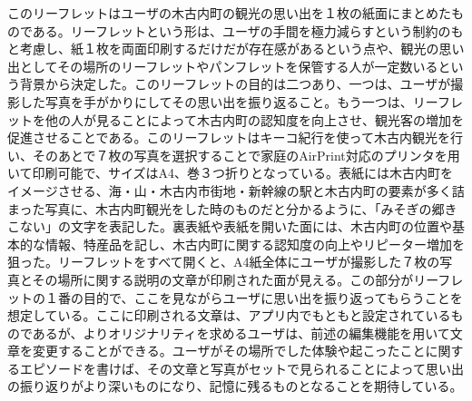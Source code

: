 このリーフレットはユーザの木古内町の観光の思い出を１枚の紙面にまとめたものである。リーフレットという形は、ユーザの手間を極力減らすという制約のもと考慮し、紙１枚を両面印刷するだけだが存在感があるという点や、観光の思い出としてその場所のリーフレットやパンフレットを保管する人が一定数いるという背景から決定した。このリーフレットの目的は二つあり、一つは、ユーザが撮影した写真を手がかりにしてその思い出を振り返ること。もう一つは、リーフレットを他の人が見ることによって木古内町の認知度を向上させ、観光客の増加を促進させることである。このリーフレットはキーコ紀行を使って木古内観光を行い、そのあとで７枚の写真を選択することで家庭のAirPrint対応のプリンタを用いて印刷可能で、サイズはA4、巻３つ折りとなっている。表紙には木古内町をイメージさせる、海・山・木古内市街地・新幹線の駅と木古内町の要素が多く詰まった写真に、木古内町観光をした時のものだと分かるように、「みそぎの郷きこない」の文字を表記した。裏表紙や表紙を開いた面には、木古内町の位置や基本的な情報、特産品を記し、木古内町に関する認知度の向上やリピーター増加を狙った。リーフレットをすべて開くと、A4紙全体にユーザが撮影した７枚の写真とその場所に関する説明の文章が印刷された面が見える。この部分がリーフレットの１番の目的で、ここを見ながらユーザに思い出を振り返ってもらうことを想定している。ここに印刷される文章は、アプリ内でもともと設定されているものであるが、よりオリジナリティを求めるユーザは、前述の編集機能を用いて文章を変更することができる。ユーザがその場所でした体験や起こったことに関するエピソードを書けば、その文章と写真がセットで見られることによって思い出の振り返りがより深いものになり、記憶に残るものとなることを期待している。

